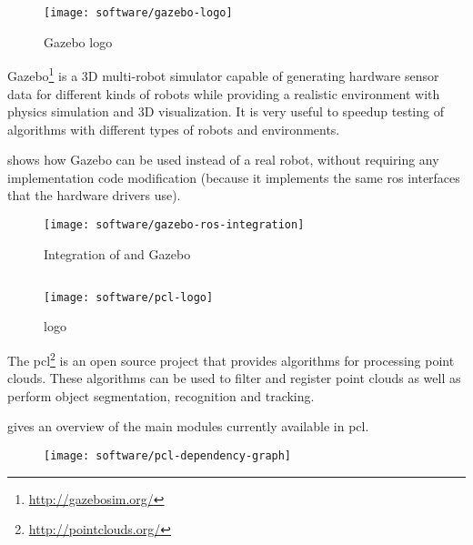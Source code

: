 \begin{wrapfigure}{r}{0.23\textwidth}
	\centering
	\vspace*{-2em}
	\texttt{[image: software/gazebo-logo]}
	\caption{Gazebo logo}
	\label{fig:gazebo-logo}
\end{wrapfigure}


Gazebo\footnote{\url{http://gazebosim.org/}} is a 3D multi-robot simulator capable of generating hardware sensor data for different kinds of robots while providing a realistic environment with physics simulation and 3D visualization. It is very useful to speedup testing of algorithms with different types of robots and environments.

 shows how Gazebo can be used instead of a real robot, without requiring any implementation code modification (because it implements the same \gls{ros} interfaces that the hardware drivers use).

\begin{figure}[H]
	\centering
	\texttt{[image: software/gazebo-ros-integration]}
	\caption[Integration of  and Gazebo]{Integration of  and Gazebo\protect\footnotemark}
	\label{fig:gazebo-ros-integration}
\end{figure}



\subsection{}

\begin{wrapfigure}{r}{0.23\textwidth}
	\centering
	\vspace*{-2em}
	\texttt{[image: software/pcl-logo]}
	\caption{ logo}
	\label{pcl-logo}
\end{wrapfigure}

The \gls{pcl}\footnote{\url{http://pointclouds.org/}} \cite{Rusu2011} is an open source project that provides algorithms for processing point clouds. These algorithms can be used to filter and register point clouds as well as perform object segmentation, recognition and tracking.

 gives an overview of the main modules currently available in \gls{pcl}.

\begin{figure}[H]
	\centering
	\texttt{[image: software/pcl-dependency-graph]}
	\caption[]{\protect\footnotemark}
	\label{fig:pcl-dependency-graph}
\end{figure}



